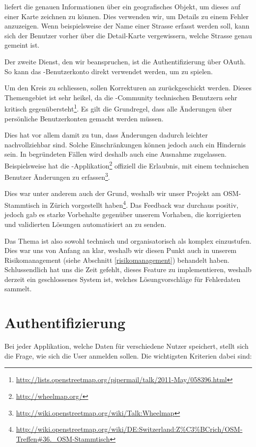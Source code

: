  liefert die genauen Informationen über ein geografisches Objekt, um dieses auf einer Karte zeichnen zu können.
Dies verwenden wir, um Details zu einem Fehler anzuzeigen.
Wenn beispielsweise der Name einer Strasse erfasst werden soll, kann sich der Benutzer vorher über die Detail-Karte vergewissern, welche Strasse genau gemeint ist.

Der zweite Dienst, den wir beanspruchen, ist die Authentifizierung über \gls{OAuth}.
So kann das -Benutzerkonto direkt verwendet werden, um \kort{} zu spielen.

Um den Kreis zu schliessen, sollen Korrekturen an  zurückgeschickt werden.
Dieses Themengebiet ist sehr heikel, da die -Community technischen Benutzern sehr kritisch gegenübersteht\footnote{\url{http://lists.openstreetmap.org/pipermail/talk/2011-May/058396.html}}.
Es gilt die Grundregel, dass alle Änderungen über persönliche Benutzerkonten gemacht werden müssen.

Dies hat vor allem damit zu tun, dass Änderungen dadurch leichter nachvollziehbar sind.
Solche Einschränkungen können jedoch auch ein Hindernis sein.
In begründeten Fällen wird deshalb auch eine Ausnahme zugelassen.
Beispielsweise hat die -Applikation\footnote{\url{http://wheelmap.org/}} offiziell die Erlaubnis, mit einem technischen Benutzer Änderungen zu erfassen\footnote{\url{http://wiki.openstreetmap.org/wiki/Talk:Wheelmap}}.

Dies war unter anderem auch der Grund, weshalb wir unser Projekt am OSM-Stammtisch in Zürich vorgestellt haben\footnote{\url{http://wiki.openstreetmap.org/wiki/DE:Switzerland:Z\%C3\%BCrich/OSM-Treffen\#36._OSM-Stammtisch}}.
Das Feedback war durchaus positiv, jedoch gab es starke Vorbehalte gegenüber unserem Vorhaben, die korrigierten und validierten Lösungen automatisiert an  zu senden.

Das Thema ist also sowohl technisch und organisatorisch als komplex einzustufen.
Dies war uns von Anfang an klar, weshalb wir diesen Punkt auch in unserem Risikomanagement (siehe Abschnitt \ref{risikomanagement}) behandelt haben.
Schlussendlich hat uns die Zeit gefehlt, dieses Feature zu implementieren, weshalb \kort{} derzeit ein geschlossenes System ist, welches Lösungvorschläge für Fehlerdaten sammelt.

\section{Authentifizierung}
Bei jeder Applikation, welche Daten für verschiedene Nutzer speichert, stellt sich die Frage, wie sich die User anmelden sollen.
Die wichtigsten Kriterien dabei sind:

